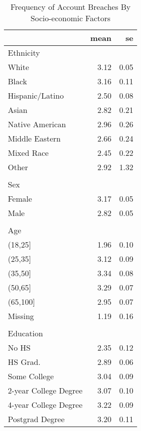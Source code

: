 \begin{table}[!htb]
\centering
\caption{Frequency of Account Breaches By Socio-economic Factors} 
\label{table:socdem_dat}
\begingroup\small
\begin{tabular}{lrr}
  \hline
 & mean & se \\ 
  \hline
Ethnicity &  &  \\ 
  White & 3.12 & 0.05 \\ 
  Black & 3.16 & 0.11 \\ 
  Hispanic/Latino & 2.50 & 0.08 \\ 
  Asian & 2.82 & 0.21 \\ 
  Native American & 2.96 & 0.26 \\ 
  Middle Eastern & 2.66 & 0.24 \\ 
  Mixed Race & 2.45 & 0.22 \\ 
  Other & 2.92 & 1.32 \\
   &  &  \\ 
  Sex &  &  \\ 
  Female & 3.17 & 0.05 \\ 
  Male & 2.82 & 0.05 \\ 
   &  &  \\  
  Age &  &  \\ 
  (18,25] & 1.96 & 0.10 \\ 
  (25,35] & 3.12 & 0.09 \\ 
  (35,50] & 3.34 & 0.08 \\ 
  (50,65] & 3.29 & 0.07 \\ 
  (65,100] & 2.95 & 0.07 \\ 
  Missing & 1.19 & 0.16 \\ 
   &  &  \\ 
  Education &  &  \\ 
  No HS & 2.35 & 0.12 \\ 
  HS Grad. & 2.89 & 0.06 \\ 
  Some College & 3.04 & 0.09 \\ 
  2-year College Degree & 3.07 & 0.10 \\ 
  4-year College Degree & 3.22 & 0.09 \\ 
  Postgrad Degree & 3.20 & 0.11 \\ 
   \hline
\end{tabular}
\endgroup
\end{table}
